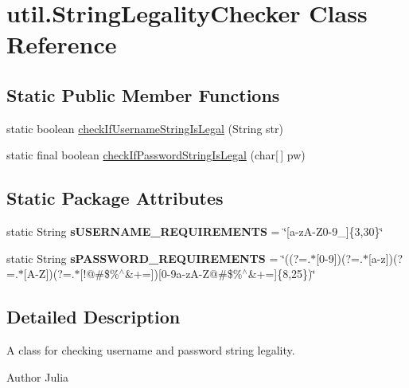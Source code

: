 \hypertarget{classutil_1_1_string_legality_checker}{
\section{util.\-String\-Legality\-Checker \-Class \-Reference}
\label{classutil_1_1_string_legality_checker}
}
\subsection*{\-Static \-Public \-Member \-Functions}
\begin{DoxyCompactItemize}
\item 
static boolean \hyperlink{classutil_1_1_string_legality_checker_a2824b130908ce87b71054f1c98d414ac}{check\-If\-Username\-String\-Is\-Legal} (\-String str)
\item 
static final boolean \hyperlink{classutil_1_1_string_legality_checker_a7f4b55ff68c3c926a78428edc2d3e831}{check\-If\-Password\-String\-Is\-Legal} (char\mbox{[}$\,$\mbox{]} pw)
\end{DoxyCompactItemize}
\subsection*{\-Static \-Package \-Attributes}
\begin{DoxyCompactItemize}
\item 
\hypertarget{classutil_1_1_string_legality_checker_a754cb8a19cf59cb8dfd34b66b2cfcc67}{
static \-String {\bfseries s\-U\-S\-E\-R\-N\-A\-M\-E\-\_\-\-R\-E\-Q\-U\-I\-R\-E\-M\-E\-N\-T\-S} = \char`\"{}\mbox{[}a-\/z\-A-\/\-Z0-\/9\-\_\-\mbox{]}\{3,30\}\char`\"{}}
\label{classutil_1_1_string_legality_checker_a754cb8a19cf59cb8dfd34b66b2cfcc67}

\item 
\hypertarget{classutil_1_1_string_legality_checker_a448d694efe19f738cd7e8b3142e029be}{
static \-String {\bfseries s\-P\-A\-S\-S\-W\-O\-R\-D\-\_\-\-R\-E\-Q\-U\-I\-R\-E\-M\-E\-N\-T\-S} = \char`\"{}((?=.$\ast$\mbox{[}0-\/9\mbox{]})(?=.$\ast$\mbox{[}a-\/z\mbox{]})(?=.$\ast$\mbox{[}\-A-\/\-Z\mbox{]})(?=.$\ast$\mbox{[}!@\#\$\%$^\wedge$\&+=\mbox{]})\mbox{[}0-\/9a-\/z\-A-\/\-Z@\#\$\%$^\wedge$\&+=\mbox{]}\{8,25\})\char`\"{}}
\label{classutil_1_1_string_legality_checker_a448d694efe19f738cd7e8b3142e029be}

\end{DoxyCompactItemize}


\subsection{\-Detailed \-Description}
\-A class for checking username and password string legality. \begin{DoxyAuthor}{\-Author}
\-Julia 
\end{DoxyAuthor}


